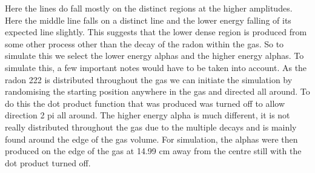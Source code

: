 \documentclass[a4paper]{article}
\begin{document}
\noindent Here the lines do fall mostly on the distinct regions at the higher amplitudes. Here the middle line falls on a distinct line and the lower energy falling of its expected line slightly. This suggests that the lower dense region is produced from some other process other than the decay of the radon within the gas. 
\newline So to simulate this we select the lower energy alphas and the higher energy alphas. To simulate this, a few important notes would have to be taken into account. As the radon 222 is distributed throughout the gas we can initiate the simulation by randomising the starting position anywhere in the gas and directed all around. To do this the dot product function that was produced was turned off to allow direction 2 pi all around. The higher energy alpha is much different, it is not really distributed throughout the gas due to the multiple decays and is mainly found around the edge of the gas volume. For simulation, the alphas were then produced on the edge of the gas at 14.99 cm away from the centre still with the dot product turned off. 
\end{document}
